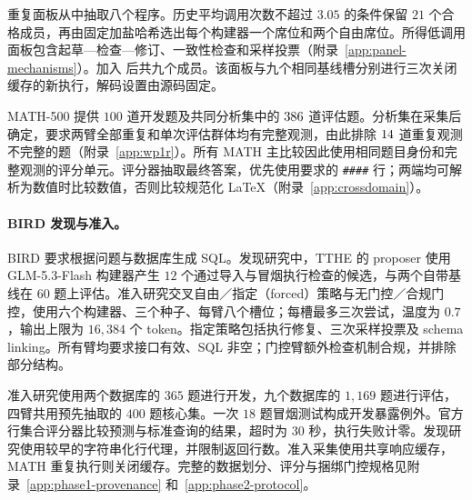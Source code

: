 重复面板从中抽取八个程序。历史平均调用次数不超过 $3.05$ 的条件保留 $21$ 个合格成员，再由固定加盐哈希选出每个构建器一个席位和两个自由席位。所得低调用面板包含起草—检查—修订、一致性检查和采样投票（附录~\ref{app:panel-mechanisms}）。加入 \bare{} 后共九个成员。该面板与九个相同基线槽分别进行三次关闭缓存的新执行，解码设置由源码固定。

MATH-500 \citep{math500} 提供 $100$ 道开发题及共同分析集中的 $386$ 道评估题。分析集在采集后确定，要求两臂全部重复和单次评估群体均有完整观测，由此排除 $14$ 道重复观测不完整的题（附录~\ref{app:wp1r}）。所有 MATH 主比较因此使用相同题目身份和完整观测的评分单元。评分器抽取最终答案，优先使用要求的 \texttt{\#\#\#\#} 行；两端均可解析为数值时比较数值，否则比较规范化 LaTeX（附录~\ref{app:crossdomain}）。

\paragraph{BIRD 发现与准入。}
\label{sec:bird-setup}
BIRD \citep{bird2021} 要求根据问题与数据库生成 SQL。发现研究中，TTHE 的 proposer 使用 GLM-5.3-Flash 构建器产生 $12$ 个通过导入与冒烟执行检查的候选，与两个自带基线在 $60$ 题上评估。准入研究交叉自由／指定（forced）策略与无门控／合规门控，使用六个构建器、三个种子、每臂八个槽位；每槽最多三次尝试，温度为 $0.7$，输出上限为 $16{,}384$ 个 token。指定策略包括执行修复、三次采样投票及 schema linking。所有臂均要求接口有效、SQL 非空；门控臂额外检查机制合规，并排除部分结构。

准入研究使用两个数据库的 $365$ 题进行开发，九个数据库的 $1{,}169$ 题进行评估，四臂共用预先抽取的 $400$ 题核心集。一次 $18$ 题冒烟测试构成开发暴露例外。官方行集合评分器比较预测与标准查询的结果，超时为 $30$ 秒，执行失败计零。发现研究使用较早的字符串化行代理，并限制返回行数。准入采集使用共享响应缓存，MATH 重复执行则关闭缓存。完整的数据划分、评分与捆绑门控规格见附录~\ref{app:phase1-provenance} 和~\ref{app:phase2-protocol}。
